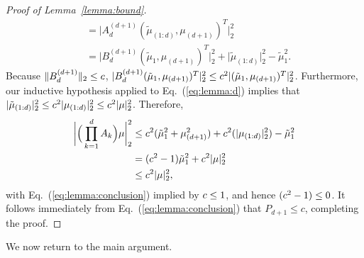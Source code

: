\begin{proof}[Proof of Lemma~\ref{lemma:bound}]
\begin{align*}
    &= \big|A^{(d+1)}_d(\tilde{\mu}_{(1:d)}, \mu_{(d+1)})^T\big|^2_2 \\
    &= \big|B^{(d+1)}_d (\tilde{\mu}_1, \mu_{(d+1)})^T\big|^2_2 + \big|\tilde{\mu}_{(1:d)}\big|^2_2 - \tilde{\mu}^2_1.
\end{align*}
Because $\|B^{(d+1)}_d\|_2 \leq c$, $|B^{(d+1)}_d (\tilde{\mu}_1, \mu_{(d+1)})^T|^2_2 \leq c^2|(\tilde{\mu}_1, \mu_{(d+1)})^T|^2_2$.
Furthermore, our inductive hypothesis applied to Eq.~(\ref{eq:lemma:d}) implies that
$|{\tilde{\mu}}_{(1:d)}|^2_2 \leq c^2|\mu_{(1:d)}|^2_2 \leq c^2|\mu|^2_2$.
Therefore,
\begin{align}
    \bigg|\Big(\prod_{k = 1}^d A_k\Big)\mu\bigg|^2_2 &\leq c^2({\tilde{\mu}}^2_1 + \mu_{(d+1)}^2) + c^2(|\mu_{(1:d)}|^2_2) - {\tilde{\mu}}^2_1 \\
    &= (c^2-1){\tilde{\mu}}^2_1 + c^2 |\mu|^2_2
    \\
    \label{eq:lemma:conclusion}
    &\leq c^2 \vert\mu\vert^2_2,
\end{align}
with Eq.~(\ref{eq:lemma:conclusion}) implied by $c \leq 1$, and hence $(c^2-1) \leq 0$.
It follows immediately from Eq.~(\ref{eq:lemma:conclusion}) that $P_{d+1}\le c$, completing the proof.
\end{proof}

We now return to the main argument.

